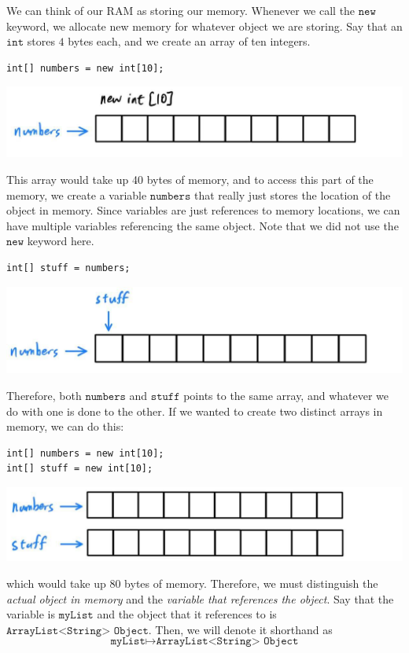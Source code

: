 \documentclass{article}
\theoremstyle{definition}
\theoremstyle{remark}
\theoremstyle{definition}
\begin{document}
We can think of our RAM as storing our memory. Whenever we call the  $\texttt{new}$ keyword, we allocate new memory for whatever object we are storing. Say that an $\texttt{int}$ stores $4$ bytes each, and we create an array of ten integers. 
\begin{verbatim}
int[] numbers = new int[10]; 
\end{verbatim}
\begin{center}
    \includegraphics[scale=0.3]{img/reference1.jpg}
\end{center}
This array would take up 40 bytes of memory, and to access this part of the memory, we create a variable $\texttt{numbers}$ that really just stores the location of the object in memory. Since variables are just references to memory locations, we can have multiple variables referencing the same object. Note that we did not use the $\texttt{new}$ keyword here. 
\begin{verbatim}
int[] stuff = numbers; 
\end{verbatim}
\begin{center}
    \includegraphics[scale=0.3]{img/reference2.jpg}
\end{center}
Therefore, both $\texttt{numbers}$ and $\texttt{stuff}$ points to the same array, and whatever we do with one is done to the other. If we wanted to create two distinct arrays in memory, we can do this: 
\begin{verbatim}
int[] numbers = new int[10]; 
int[] stuff = new int[10]; 
\end{verbatim}
\begin{center}
    \includegraphics[scale=0.3]{img/reference3.jpg}
\end{center}
which would take up 80 bytes of memory. Therefore, we must distinguish the \textit{actual object in memory} and the \textit{variable that references the object}. Say that the variable is $\texttt{myList}$ and the object that it references to is $\texttt{ArrayList<String> Object}$. Then, we will denote it shorthand as 
\[\texttt{myList} \mapsto \texttt{ArrayList<String> Object}\]
\end{document}

